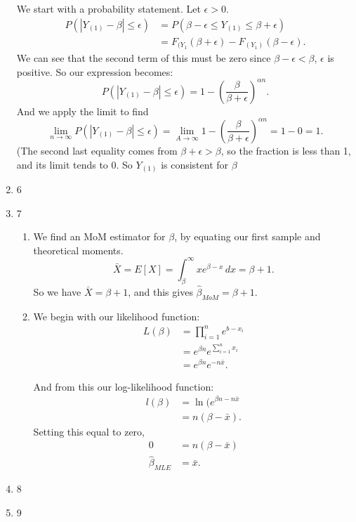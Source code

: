 \documentclass{article}
\begin{document}
\begin{enumerate}
    We start with a probability statement. Let $\epsilon>0$.
    \begin{align*}
        P(|Y_{(1)}-\beta|\leq\epsilon)&=P(\beta-\epsilon\leq Y_{(1)}\leq\beta+\epsilon)\\
        &= F_{(Y_1}(\beta+\epsilon)-F_{(Y_1)}(\beta-\epsilon) 
    .\end{align*}
    We can see that the second term of this must be zero since $\beta-\epsilon<\beta$, $\epsilon$ is 
    positive. So our expression becomes:
    \[
        P(|Y_{(1)}-\beta|\leq\epsilon)=1-\left( \frac{\beta}{\beta+\epsilon} \right) ^{\alpha n}
    .\] 
    And we apply the limit to find
    \[
        \lim_{n \to \infty} P(|Y_{(1)}-\beta|\leq\epsilon)=\lim_{A \to \infty} 1-\left( \frac{\beta}{\beta+\epsilon} \right) ^{\alpha n}=1-0=1
    .\] 
    (The second last equality comes from $\beta+\epsilon>\beta$, so the fraction is less than 1, and its limit tends to 0.
    So $Y_{(1)} $ is consistent for $\beta$
\item 6
\item 7

    \begin{enumerate}[label= (\alph*)] 
        \item We find an MoM estimator for $\beta$, by equating our first sample and theoretical 
            moments.
            \[
                \bar{X}=E[X]=\int_{\beta}^{\infty} xe^{\beta-x} \, d x =\beta+1
            .\] 
            So we have $\bar{X}=\beta+1$, and this gives $\hat{\beta}_{MoM}=\beta+1$.

        \item We begin with our likelihood function:
            \begin{align*}
                L(\beta)&=\prod_{i=1}^{n}e^{b-x_i}\\
                &= e^{\beta n}e^{\sum_{i=1}^{n} x_i} \\
                &= e^{\beta n}e^{-n\bar{x}} 
            .\end{align*}

            And from this our log-likelihood function:
            \begin{align*}
                l(\beta)&= \ln(e^{\beta n- n \bar{x}} \\
                &= n(\beta-\bar{x}) 
            .\end{align*}
            Setting this equal to zero,
            \begin{align*}
                0&=n(\beta-\bar{x})\\
                \hat{\beta}_{MLE}&=\bar{x} 
            .\end{align*}
    \end{enumerate}
\item 8
\item 9


\end{enumerate}
\end{document}
